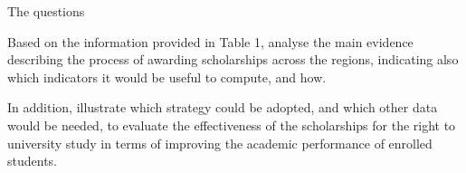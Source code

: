 \documentclass[aspectratio=169,xcolor=table]{beamer}
\begin{document}
\begin{frame}{The questions}
\begin{block}{}
Based on the information provided in Table 1, analyse the main evidence describing the process of awarding scholarships across the regions, indicating also which indicators it would be useful to compute, and how.
\end{block}
\vspace{0.2cm}
\begin{block}{}
In addition, illustrate which strategy could be adopted, and which other data would be needed, to evaluate the effectiveness of the scholarships for the right to university study in terms of improving the academic performance of enrolled students.
\end{block}
\end{frame}
\end{document}
